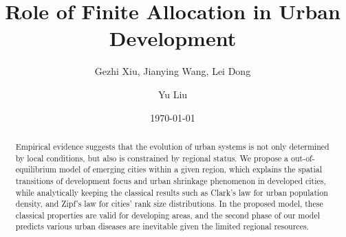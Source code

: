\documentclass[reprint,unsortedaddress,amsmath,amssymb,aps,prl,showkeys]{revtex4-2}
\begin{document}
\title{Role of Finite Allocation in Urban Development}
\author{Gezhi Xiu, Jianying Wang, Lei Dong}
\author{Yu Liu}
\date{\today}

\begin{abstract}
	Empirical evidence suggests that the evolution of urban systems is not only determined by local conditions, but also is constrained by regional status. We propose a out-of-equilibrium model of emerging cities within a given region, which explains the spatial transitions of development focus and urban shrinkage phenomenon in developed cities, while analytically keeping the classical results such as Clark's law for urban population density, and Zipf's law for cities' rank size distributions. In the proposed model, these classical properties are valid for developing areas, and the second phase of our model predicts various urban diseases are inevitable given the limited regional resources. 
\end{abstract}

\maketitle

\end{document}
